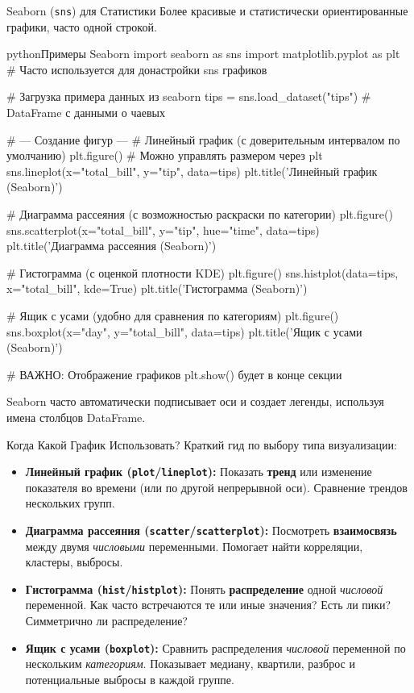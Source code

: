 \begin{myblock}{{Seaborn (\texttt{sns}) для Статистики}}
    Более красивые и статистически ориентированные графики, часто одной строкой.
    \begin{codebox}{python}{Примеры Seaborn}
    import seaborn as sns
    import matplotlib.pyplot as plt # Часто используется для донастройки sns графиков

    # Загрузка примера данных из seaborn
    tips = sns.load_dataset("tips") # DataFrame с данными о чаевых

    # --- Создание фигур ---
    # Линейный график (с доверительным интервалом по умолчанию)
    plt.figure() # Можно управлять размером через plt
    sns.lineplot(x="total_bill", y="tip", data=tips)
    plt.title('Линейный график (Seaborn)')

    # Диаграмма рассеяния (с возможностью раскраски по категории)
    plt.figure()
    sns.scatterplot(x="total_bill", y="tip", hue="time", data=tips)
    plt.title('Диаграмма рассеяния (Seaborn)')

    # Гистограмма (с оценкой плотности KDE)
    plt.figure()
    sns.histplot(data=tips, x="total_bill", kde=True)
    plt.title('Гистограмма (Seaborn)')

    # Ящик с усами (удобно для сравнения по категориям)
    plt.figure()
    sns.boxplot(x="day", y="total_bill", data=tips)
    plt.title('Ящик с усами (Seaborn)')

    # ВАЖНО: Отображение графиков plt.show() будет в конце секции
    \end{codebox}
    Seaborn часто автоматически подписывает оси и создает легенды, используя имена столбцов DataFrame.
\end{myblock}

\begin{myexampleblock}{Когда Какой График Использовать?}
    Краткий гид по выбору типа визуализации:
    \begin{itemize}
        \item \textbf{Линейный график (\texttt{plot}/\texttt{lineplot}):} Показать \textbf{тренд} или изменение показателя во времени (или по другой непрерывной оси). Сравнение трендов нескольких групп.
        \item \textbf{Диаграмма рассеяния (\texttt{scatter}/\texttt{scatterplot}):} Посмотреть \textbf{взаимосвязь} между двумя \textit{числовыми} переменными. Помогает найти корреляции, кластеры, выбросы.
        \item \textbf{Гистограмма (\texttt{hist}/\texttt{histplot}):} Понять \textbf{распределение} одной \textit{числовой} переменной. Как часто встречаются те или иные значения? Есть ли пики? Симметрично ли распределение?
        \item \textbf{Ящик с усами (\texttt{boxplot}):} Сравнить распределения \textit{числовой} переменной по нескольким \textit{категориям}. Показывает медиану, квартили, разброс и потенциальные выбросы в каждой группе.
    \end{itemize}
\end{myexampleblock}

